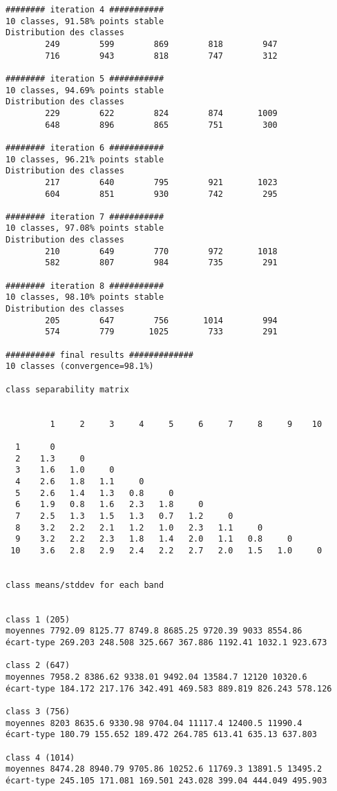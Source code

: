 \documentclass[sustainability,article,submit,pdftex,moreauthors]{Definitions/mdpi}
\begin{document}
\begin{footnotesize}
\begin{verbatim}
######## iteration 4 ###########
10 classes, 91.58% points stable
Distribution des classes
        249        599        869        818        947
        716        943        818        747        312

######## iteration 5 ###########
10 classes, 94.69% points stable
Distribution des classes
        229        622        824        874       1009
        648        896        865        751        300

######## iteration 6 ###########
10 classes, 96.21% points stable
Distribution des classes
        217        640        795        921       1023
        604        851        930        742        295

######## iteration 7 ###########
10 classes, 97.08% points stable
Distribution des classes
        210        649        770        972       1018
        582        807        984        735        291

######## iteration 8 ###########
10 classes, 98.10% points stable
Distribution des classes
        205        647        756       1014        994
        574        779       1025        733        291

########## final results #############
10 classes (convergence=98.1%)

class separability matrix


         1     2     3     4     5     6     7     8     9    10

  1      0
  2    1.3     0
  3    1.6   1.0     0
  4    2.6   1.8   1.1     0
  5    2.6   1.4   1.3   0.8     0
  6    1.9   0.8   1.6   2.3   1.8     0
  7    2.5   1.3   1.5   1.3   0.7   1.2     0
  8    3.2   2.2   2.1   1.2   1.0   2.3   1.1     0
  9    3.2   2.2   2.3   1.8   1.4   2.0   1.1   0.8     0
 10    3.6   2.8   2.9   2.4   2.2   2.7   2.0   1.5   1.0     0


class means/stddev for each band


class 1 (205)
moyennes 7792.09 8125.77 8749.8 8685.25 9720.39 9033 8554.86
écart-type 269.203 248.508 325.667 367.886 1192.41 1032.1 923.673

class 2 (647)
moyennes 7958.2 8386.62 9338.01 9492.04 13584.7 12120 10320.6
écart-type 184.172 217.176 342.491 469.583 889.819 826.243 578.126

class 3 (756)
moyennes 8203 8635.6 9330.98 9704.04 11117.4 12400.5 11990.4
écart-type 180.79 155.652 189.472 264.785 613.41 635.13 637.803

class 4 (1014)
moyennes 8474.28 8940.79 9705.86 10252.6 11769.3 13891.5 13495.2
écart-type 245.105 171.081 169.501 243.028 399.04 444.049 495.903


\end{verbatim}
\end{footnotesize}
\end{document}
